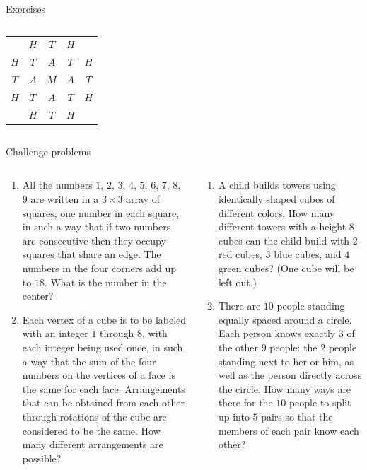\documentclass[9pt,aspectratio=169]{beamer}
\begin{document}
\begin{frame}{Exercises}
\begin{columns}[T]
\begin{column}{0.5\textwidth}
\begin{enumerate}
\begin{center}
\begin{tabular}{ccccc}
              & \cellcolor{backgroundOrange}$H$ & $T$ & $H$ & \\
            $H$ & \cellcolor{backgroundOrange}$T$ & \cellcolor{backgroundOrange}$A$ & $T$ & $H$ \\
            $T$ & $A$ & \cellcolor{backgroundOrange}$M$ & $A$ & $T$ \\
            $H$ & $T$ & $A$ & $T$ & $H$ \\
              & $H$ & $T$ & $H$ &
          \end{tabular}
        \end{center}
      \end{enumerate}
    \end{column}
  \end{columns}
\end{frame}

\begin{frame}{Challenge problems}
  \begin{columns}[T]
    \begin{column}{0.5\textwidth}
      \begin{enumerate}
        \item All the numbers $1$, $2$, $3$, $4$, $5$, $6$, $7$, $8$, $9$ are written in a $3\times3$ array of squares, one number in each square, in such a way that if two numbers are consecutive then they occupy squares that share an edge. The numbers in the four corners add up to $18$. What is the number in the center?
        \item Each vertex of a cube is to be labeled with an integer $1$ through $8$, with each integer being used once, in such a way that the sum of the four numbers on the vertices of a face is the same for each face. Arrangements that can be obtained from each other through rotations of the cube are considered to be the same. How many different arrangements are possible?
        \seti
      \end{enumerate}
    \end{column}
    \begin{column}{0.5\textwidth}
      \begin{enumerate}
        \conti
        \item A child builds towers using identically shaped cubes of different colors. How many different towers with a height $8$ cubes can the child build with $2$ red cubes, $3$ blue cubes, and $4$ green cubes? (One cube will be left out.)
        \item There are $10$ people standing equally spaced around a circle. Each person knows exactly $3$ of the other $9$ people: the $2$ people standing next to her or him, as well as the person directly across the circle. How many ways are there for the $10$ people to split up into $5$ pairs so that the members of each pair know each other?
      \end{enumerate}
    \end{column}
  \end{columns}
\end{frame}
\end{document}
